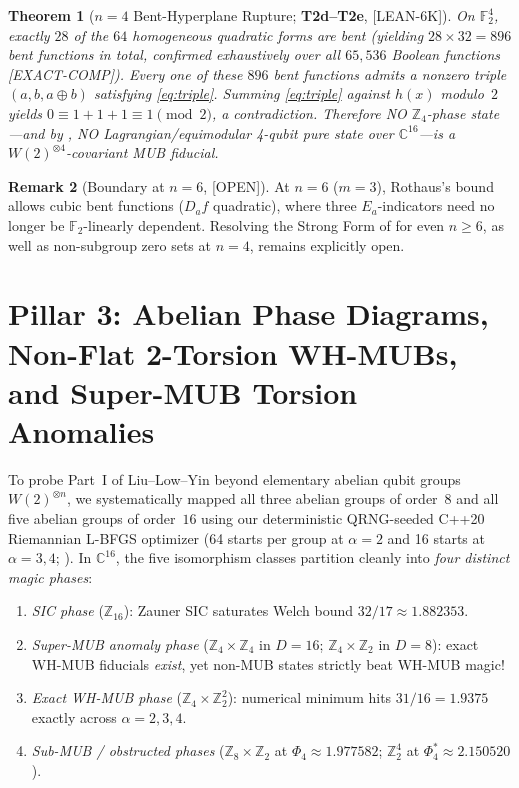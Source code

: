 \documentclass[11pt,reqno]{amsart}
\newtheorem{theorem}{Theorem}[section]
\theoremstyle{definition}
\newtheorem{remark}[theorem]{Remark}
\newcommand{\F}{\mathbb{F}}
\newcommand{\Z}{\mathbb{Z}}
\newcommand{\C}{\mathbb{C}}
\newcommand{\taglean}{\textsf{[LEAN-6K]}}
\newcommand{\tagcomp}{\textsf{[EXACT-COMP]}}
\newcommand{\tagopen}{\textsf{[OPEN]}}
\begin{document}
\begin{theorem}[$n=4$ Bent-Hyperplane Rupture; \textbf{T2d--T2e}, \taglean]\label{thm:n4-rupture}
On $\F_2^4$, exactly $28$ of the $64$ homogeneous quadratic forms are bent (yielding
$28\times 32=896$ bent functions in total, confirmed exhaustively over all $65{,}536$
Boolean functions \tagcomp). Every one of these $896$ bent functions admits a nonzero
triple $(a,b,a\oplus b)$ satisfying \eqref{eq:triple}. Summing \eqref{eq:triple} against
$h(x)$ modulo~$2$ yields $0\equiv 1+1+1\equiv 1\pmod 2$, a contradiction. Therefore NO
$\Z_4$-phase state---and by , NO Lagrangian/equimodular 4-qubit pure
state over $\C^{16}$---is a $W(2)^{\otimes 4}$-covariant MUB fiducial.
\end{theorem}

\begin{remark}[Boundary at $n=6$, \tagopen]
At $n=6$ ($m=3$), Rothaus's bound allows cubic bent functions ($D_af$ quadratic), where
three $E_a$-indicators need no longer be $\F_2$-linearly dependent. Resolving the Strong
Form of \cite{Damski2026ProductWH} for even $n\ge 6$, as well as non-subgroup zero sets
at $n=4$, remains explicitly open.
\end{remark}

\section{Pillar 3: Abelian Phase Diagrams, Non-Flat 2-Torsion WH-MUBs, and Super-MUB Torsion Anomalies}\label{sec:pillar3}

To probe Part~I of Liu--Low--Yin \cite{Liu2026MaximalMagic} beyond elementary abelian
qubit groups $W(2)^{\otimes n}$, we systematically mapped all three abelian groups of
order~$8$ and all five abelian groups of order~$16$ using our deterministic QRNG-seeded
C++20 Riemannian L-BFGS optimizer (64 starts per group at $\alpha=2$ and 16 starts at
$\alpha=3,4$; ). In $\C^{16}$, the five isomorphism classes
partition cleanly into \emph{four distinct magic phases}:
\begin{enumerate}[leftmargin=1.8em]
  \item \emph{SIC phase} ($\Z_{16}$): Zauner SIC saturates Welch bound $32/17\approx 1.882353$.
  \item \emph{Super-MUB anomaly phase} ($\Z_4\times\Z_4$ in $D=16$; $\Z_4\times\Z_2$ in $D=8$):
  exact WH-MUB fiducials \emph{exist}, yet non-MUB states strictly beat WH-MUB magic!
  \item \emph{Exact WH-MUB phase} ($\Z_4\times\Z_2^2$): numerical minimum hits $31/16=1.9375$
  exactly across $\alpha=2,3,4$.
  \item \emph{Sub-MUB / obstructed phases} ($\Z_8\times\Z_2$ at $\Phi_4\approx 1.977582$;
  $\Z_2^4$ at $\Phi_4^*\approx 2.150520$).
\end{enumerate}
\end{document}
